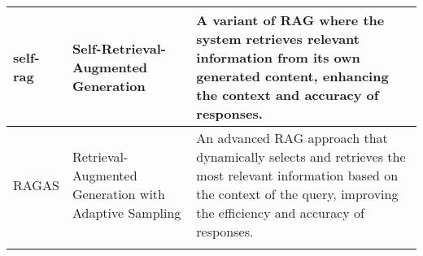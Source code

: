 \begin{tabularx}{\textwidth}{
  >{\raggedright\arraybackslash}p{2.5cm}
  >{\raggedright\arraybackslash}p{4cm}
  >{\noindent\justifying\arraybackslash}X
}
\cmidrule(lr){1-3}
self-rag & Self-Retrieval-Augmented Generation & A variant of RAG where the system retrieves relevant information from its own generated content, enhancing the context and accuracy of responses. \\
\cmidrule(lr){1-3}
RAGAS & Retrieval-Augmented Generation with Adaptive Sampling & An advanced RAG approach that dynamically selects and retrieves the most relevant information based on the context of the query, improving the efficiency and accuracy of responses. \\
\cmidrule(lr){1-3}
\bottomrule
\end{tabularx}
